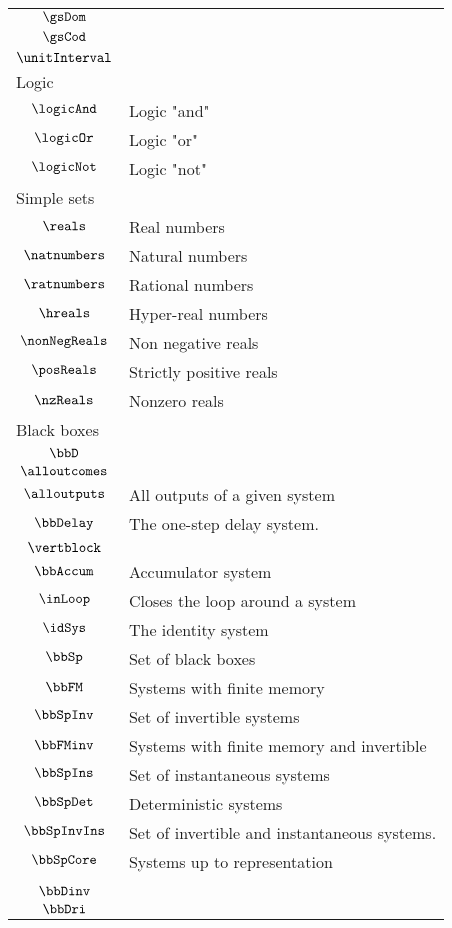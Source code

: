 \begin{longtable}{cl}
 $\gsDom$ &  \\ 
 $\gsCod$ &  \\ 
 $\unitInterval$ & \\ 
 \multicolumn{2}{l}{Logic}\\ 
 \hline
$\logicAnd$ &  Logic "and"\\ 
 $\logicOr$ &  Logic "or"\\ 
 $\logicNot$ &  Logic "not"\\ 
 \multicolumn{2}{l}{Simple sets}\\ 
 \hline
$\reals$ &  Real numbers\\ 
 $\natnumbers$ &  Natural numbers\\ 
 $\ratnumbers$ &  Rational numbers\\ 
 $\hreals$ &  Hyper-real numbers\\ 
 $\nonNegReals$ &  Non negative reals \\ 
 $\posReals$ &  Strictly positive reals\\ 
 $\nzReals$ &  Nonzero reals\\ 
 \multicolumn{2}{l}{Black boxes}\\ 
 \hline
$\bbD$ & \\ 
 $\alloutcomes$ & \\ 
 $\alloutputs$ &  All outputs of a given system\\ 
 $\bbDelay$ &  The one-step delay system.\\ 
 $\vertblock$ & \\ 
 $\bbAccum$ &  Accumulator system\\ 
 $\inLoop$ &  Closes the loop around a system\\ 
 $\idSys$ &  The identity system\\ 
 $\bbSp$ &  Set of black boxes\\ 
 $\bbFM$ &  Systems with finite memory\\ 
 $\bbSpInv$ &  Set of invertible systems\\ 
 $\bbFMinv$ &  Systems with finite memory and invertible\\ 
 $\bbSpIns$ &  Set of instantaneous systems\\ 
 $\bbSpDet$ &  Deterministic systems\\ 
 $\bbSpInvIns$ &  Set of invertible and instantaneous systems.\\ 
 $\bbSpCore$ &  Systems up to representation\\ 
 \multicolumn{2}{l}{}\\ 
 \hline
$\bbDinv$ & \\ 
 $\bbDri$ & \\ 

\end{longtable}
